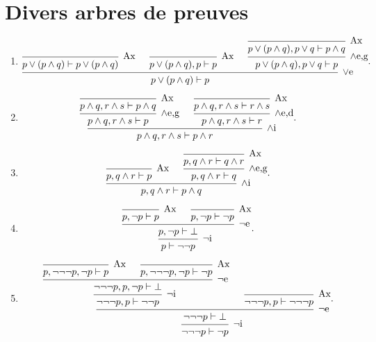 \section{Divers arbres de preuves}

\begin{enumerate}
	\item
		{\footnotesize\[
			\begin{prooftree}
				\infer 0[Ax]{p \lor (p \land q) \vdash p \lor (p \land q)}
				\infer 0[Ax]{p \lor (p \land q), p \vdash p}
				\infer 0[Ax]{p \lor (p \land q), p \lor q \vdash p \land q}
				\infer 1[$\land$e,g]{p \lor (p \land q), p \lor q \vdash p} %
				\infer 3[$\lor$e]{p \lor (p \land q) \vdash p} %
			\end{prooftree}
		.\]}
	\item
		\[
			\begin{prooftree}
				\infer 0[Ax]{p \land q,r \land s \vdash p \land q}
				\infer 1[$\land$e,g]{p \land q, r \land s \vdash p} %
				\infer 0[Ax]{p \land q,r \land s \vdash r \land s}
				\infer 1[$\land$e,d]{p \land q, r \land s \vdash r} %
				\infer 2[$\land$i]{p \land q, r \land s \vdash p \land r}
			\end{prooftree}
		.\]
	\item
		\[
			\begin{prooftree}
				\infer 0[Ax]{p, q \land r \vdash p}
				\infer 0[Ax]{p,q \land r \vdash q \land r}
				\infer 1[$\land$e,g]{p,q \land r \vdash q} %
				\infer 2[$\land$i]{p,q \land r \vdash p \land q}
			\end{prooftree}
		.\]
	\item
		\[
			\begin{prooftree}
				\infer 0[Ax]{p,\lnot p \vdash p}
				\infer 0[Ax]{p,\lnot p \vdash \lnot p}
				\infer 2[$\lnot$e]{p,\lnot p \vdash \bot} %
				\infer 1[$\lnot$i]{p \vdash \lnot \lnot p}
			\end{prooftree}
		.\]
	\item
		\[
			\begin{prooftree}
				\infer 0[Ax]{p,\lnot \lnot \lnot p,\lnot p \vdash p}
				\infer 0[Ax]{p,\lnot \lnot \lnot p,\lnot p \vdash \lnot p}
				\infer 2[$\lnot$e]{\lnot \lnot \lnot p,p,\lnot p \vdash \bot} %
				\infer 1[$\lnot$i]{\lnot \lnot \lnot p,p \vdash \lnot \lnot p}
				\infer 0[Ax]{\lnot \lnot \lnot p,p \vdash\lnot \lnot \lnot p}
				\infer 2[$\lnot$e]{\lnot \lnot \lnot p \vdash \bot} %
				\infer 1[$\lnot$i]{\lnot \lnot \lnot p \vdash \lnot p}
			\end{prooftree}
		.\] 
\end{enumerate}
